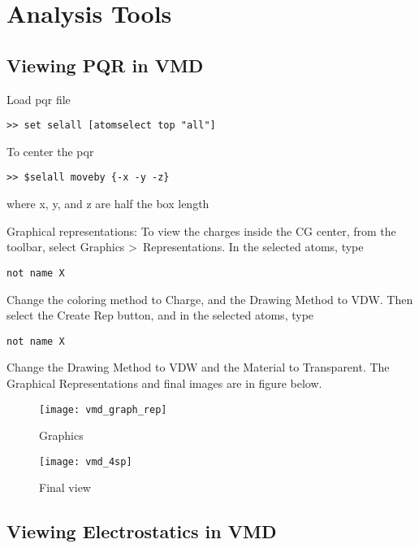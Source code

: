 
\chapter{Analysis Tools}

\section{Viewing PQR in VMD}

Load pqr file
\begin{lstlisting}[style = MyBash]
>> set selall [atomselect top "all"]
\end{lstlisting}

To center the pqr
\begin{lstlisting}[style = MyBash]
>> $selall moveby {-x -y -z}
\end{lstlisting}
where x, y, and z are half the box length

Graphical representations:
To view the charges inside the CG center, from the toolbar, select Graphics \textgreater \,
Representations. In the selected atoms, type
\begin{lstlisting}[style = MyBash]
not name X
\end{lstlisting}

Change the coloring method to Charge, and the Drawing Method to VDW. Then select the 
Create Rep button, and in the selected atoms, type 
\begin{lstlisting}[style = MyBash]
not name X
\end{lstlisting}

 Change the Drawing Method to VDW and the Material to Transparent. 
 The Graphical Representations and final images are in figure below.

\begin{figure}[!htbp]
  \centering
  \begin{minipage}[b]{0.3\textwidth}
    \texttt{[image: vmd\_graph\_rep]}
    \caption{Graphics}
  \end{minipage}
  \hfill
  \begin{minipage}[b]{0.65\textwidth}
    \texttt{[image: vmd\_4sp]}
    \caption{Final view}
  \end{minipage}
\end{figure}

\section{Viewing Electrostatics in VMD}


